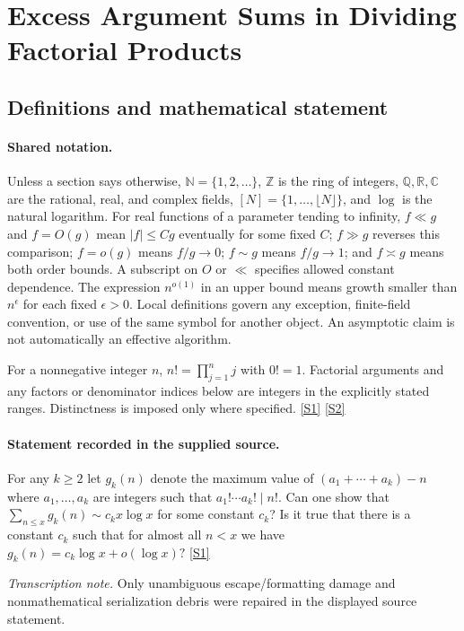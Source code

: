 \documentclass[11pt,a4paper]{article}
\newcommand{\N}{\mathbb{N}}
\newcommand{\Z}{\mathbb{Z}}
\newcommand{\Q}{\mathbb{Q}}
\newcommand{\R}{\mathbb{R}}
\newcommand{\C}{\mathbb{C}}
\newcommand{\sref}[2]{\hyperlink{source:#1:#2}{[S#2]}}
\begin{document}
\section{Excess Argument Sums in Dividing Factorial Products}\label{statement}


\subsection{Definitions and mathematical statement}

\paragraph{Shared notation.}Unless a section says otherwise, $\N=\{1,2,\ldots\}$,
$\Z$ is the ring of integers, $\Q,\R,\C$ are the rational, real, and complex
fields, $[N]=\{1,\ldots,\lfloor N\rfloor\}$, and $\log$ is the natural
logarithm. For real functions of a parameter tending to infinity,
$f\ll g$ and $f=O(g)$ mean $|f|\leq Cg$ eventually for some fixed $C$;
$f\gg g$ reverses this comparison; $f=o(g)$ means $f/g\to0$;
$f\sim g$ means $f/g\to1$; and $f\asymp g$ means both order bounds.
A subscript on $O$ or $\ll$ specifies allowed constant dependence.
The expression $n^{o(1)}$ in an upper bound means growth smaller than
$n^\epsilon$ for each fixed $\epsilon>0$. Local definitions govern any
exception, finite-field convention, or use of the same symbol for another
object. An asymptotic claim is not automatically an effective algorithm.



For a nonnegative integer $n$, $n!=\prod_{j=1}^n j$ with $0!=1$. Factorial arguments and any factors or denominator indices below are integers in the explicitly stated ranges. Distinctness is imposed only where specified. \sref{statement}{1} \sref{statement}{2}

\paragraph{Statement recorded in the supplied source.}
For any $k\geq 2$ let $g_k(n)$ denote the maximum value of $ (a_1+\cdots+a_k)-n $ where $a_1,\ldots,a_k$ are integers such that $a_1!\cdots a_k! \mid n!$. Can one show that $ \sum_{n\leq x}g_k(n) \sim c_k x\log x $ for some constant $c_k$? Is it true that there is a constant $c_k$ such that for almost all $n<x$ we have $ g_k(n)=c_k\log x+o(\log x)? $ \sref{statement}{1}

{\small\emph{Transcription note.} Only unambiguous escape/formatting damage and nonmathematical serialization debris were repaired in the displayed source statement.}
\end{document}
